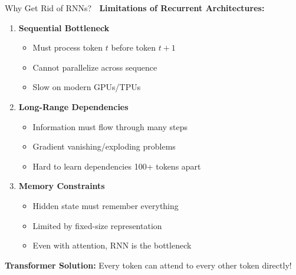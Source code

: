 \documentclass[aspectratio=169]{beamer}
\begin{document}
\begin{frame}[shrink=10]{Why Get Rid of RNNs? 🚫}
\textbf{Limitations of Recurrent Architectures:}

\vspace{1em}

\begin{enumerate}\setlength{\itemsep}{0pt}
    \item \textbf{Sequential Bottleneck}
    \begin{itemize}\setlength{\itemsep}{0pt}
        \item Must process token $t$ before token $t+1$
        \item Cannot parallelize across sequence
        \item Slow on modern GPUs/TPUs
    \end{itemize}

    \vspace{0.5em}

    \item \textbf{Long-Range Dependencies}
    \begin{itemize}\setlength{\itemsep}{0pt}
        \item Information must flow through many steps
        \item Gradient vanishing/exploding problems
        \item Hard to learn dependencies 100+ tokens apart
    \end{itemize}

    \vspace{0.5em}

    \item \textbf{Memory Constraints}
    \begin{itemize}\setlength{\itemsep}{0pt}
        \item Hidden state must remember everything
        \item Limited by fixed-size representation
        \item Even with attention, RNN is the bottleneck
    \end{itemize}
\end{enumerate}

\vspace{1em}

\textbf{Transformer Solution:} Every token can attend to every other token directly!
\end{frame}
\end{document}

